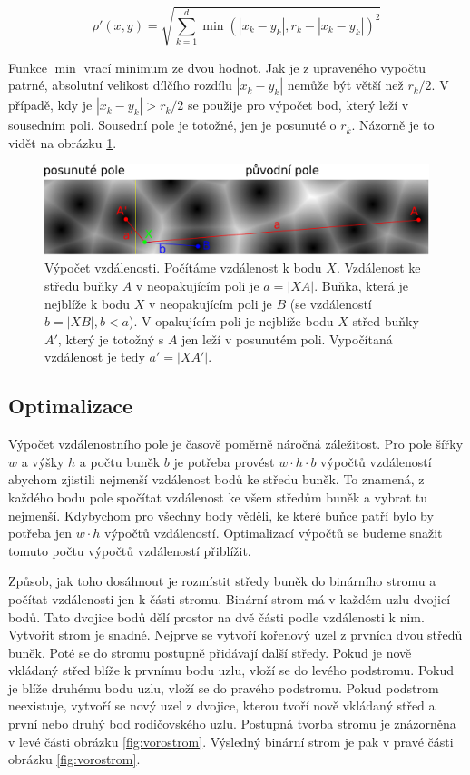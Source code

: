 \begin{equation}
\label{eq:vorovzdalenost}
\rho'(x,y)=\sqrt{\sum_{k=1}^{d}\min(|x_k-y_k|,r_k-|x_k-y_k|)^2}
\end{equation}

Funkce $\min$ vrací minimum ze dvou hodnot.
Jak je z upraveného vypočtu patrné, absolutní velikost dílčího rozdílu $|x_k-y_k|$ nemůže být větší než $r_k/2$.
V případě, kdy je $|x_k-y_k|>r_k/2$ se použije pro výpočet bod, který leží v sousedním poli.
Sousední pole je totožné, jen je posunuté o $r_k$.
Názorně je to vidět na obrázku \ref{fig:navazovani}.

\begin{figure}[h]
\centering
\includegraphics[width=15cm,keepaspectratio]{obr/navazovani.pdf}
\caption{
Výpočet vzdálenosti.
Počítáme vzdálenost k bodu $X$.
Vzdálenost ke středu buňky $A$ v neopakujícím poli je $a=|XA|$.
Buňka, která je nejblíže k bodu $X$ v neopakujícím poli je $B$ (se vzdáleností $b=|XB|,b<a$).
V opakujícím poli je nejblíže bodu $X$ střed buňky $A'$, který je totožný s $A$ jen leží v posunutém poli.
Vypočítaná vzdálenost je tedy $a'=|XA'|$.}
\label{fig:navazovani}
\end{figure}

\subsection{Optimalizace}
Výpočet vzdálenostního pole je časově poměrně náročná záležitost.
Pro pole šířky $w$ a výšky $h$ a počtu buněk $b$ je potřeba provést $w \cdot h \cdot b$ výpočtů vzdáleností abychom zjistili nejmenší vzdálenost bodů ke středu buněk.
To znamená, z každého bodu pole spočítat vzdálenost ke všem středům buněk a vybrat tu nejmenší.
Kdybychom pro všechny body věděli, ke které buňce patří bylo by potřeba jen $w \cdot h$ výpočtů vzdáleností.
Optimalizací výpočtů se budeme snažit tomuto počtu výpočtů vzdáleností přiblížit.

Způsob, jak toho dosáhnout je rozmístit středy buněk do binárního stromu a počítat vzdálenosti jen k části stromu.
Binární strom má v každém uzlu dvojicí bodů.
Tato dvojice bodů dělí prostor na dvě části podle vzdálenosti k nim.
Vytvořit strom je snadné.
Nejprve se vytvoří kořenový uzel z prvních dvou středů buněk.
Poté se do stromu postupně přidávají další středy.
Pokud je nově vkládaný střed blíže k prvnímu bodu uzlu, vloží se do levého podstromu.
Pokud je blíže druhému bodu uzlu, vloží se do pravého podstromu.
Pokud podstrom neexistuje, vytvoří se nový uzel z dvojice, kterou tvoří nově vkládaný střed a první nebo druhý bod rodičovského uzlu.
Postupná tvorba stromu je znázorněna v levé části obrázku \ref{fig:vorostrom}.
Výsledný binární strom je pak v pravé části obrázku \ref{fig:vorostrom}.

